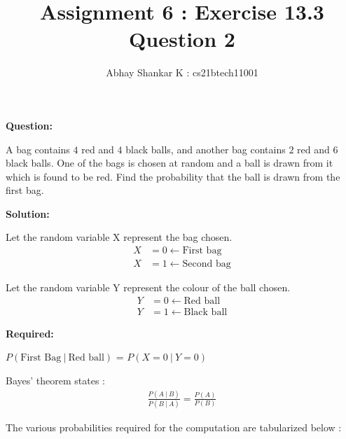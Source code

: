 \documentclass[journal,12pt,twocolumn]{IEEEtran}
\begin{document}
	\title{Assignment 6 : Exercise 13.3 Question 2}
		\author{ Abhay Shankar K : cs21btech11001}

		\maketitle

		\bigskip

	\providecommand{\brak}[1]{\ensuremath{\left(#1\right)}}
	\providecommand{\sbrak}[1]{\ensuremath{\left[#1\right]}}
	\providecommand{\cbrak}[1]{\ensuremath{\left\{#1\right\}}}
	\newcommand{\solution}{\noindent \textbf{Solution: }}
	\newcommand{\question}{\noindent \textbf{Question: }}
	\newcommand{\req}{\noindent \textbf{Required: }}
	\providecommand{\rpr}[2]{\ensuremath{P_{#1}\left(#2\right)}} %
	\providecommand{\spr}[1]{\ensuremath{P\left(#1\right)}} %
	\providecommand{\cpr}[2]{\ensuremath{\spr{#1\ |\ #2}}} %
	
	
	\question
	
	
	A bag contains $4$ red and $4$ black balls, and another bag contains $2$ red and $6$ black balls. One of the bags is chosen at random and a ball is drawn from it which is found to be red. Find the probability that the ball is drawn from the first bag.
	
	
	\solution
	
	
	Let the random variable X represent the bag chosen.
	\begin{align}
		X &= 0 \leftarrow \text{First bag} \nonumber \\
		X &= 1 \leftarrow \text{Second bag}
			\label{Xrange}
	\end{align}
	
	
	Let the random variable Y represent the colour of the ball chosen.
	\begin{align}
		Y &= 0 \leftarrow \text{Red ball} \nonumber \\
		Y &= 1 \leftarrow \text{Black ball}
			\label{Yrange}
	\end{align}


	\req 
	
	\raggedright \cpr{\text{First Bag}}{\text{Red ball}} = \cpr{X = 0}{Y = 0}
	
	
	Bayes' theorem states :
	\begin{align}
		\frac{\cpr{A}{B}}{\cpr{B}{A}} = \frac{\spr{A}}{\spr{B}} 
			\label{Bayes_thm}
	\end{align}
	
	
	The various probabilities required for the computation are tabularized below :
	
\end{document}
